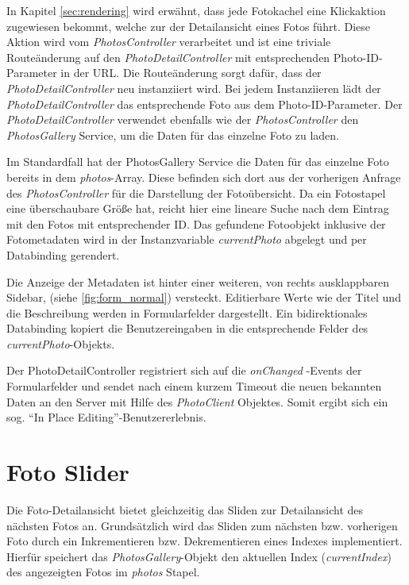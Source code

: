 In Kapitel \ref{sec:rendering} wird erwähnt, dass jede Fotokachel eine Klickaktion zugewiesen bekommt, welche zur der Detailansicht eines Fotos führt. Diese Aktion wird vom \emph{PhotosController} verarbeitet und ist eine triviale Routeänderung auf den \emph{PhotoDetailController} mit entsprechenden Photo-ID-Parameter in der URL. Die Routeänderung sorgt dafür, dass der \emph{PhotoDetailController} neu instanziiert wird. Bei jedem Instanziieren lädt der \emph{PhotoDetailController} das entsprechende Foto aus dem  Photo-ID-Parameter. Der \emph{PhotoDetailController} verwendet ebenfalls wie der \emph{PhotosController} den \emph{PhotosGallery} Service, um die Daten für das einzelne Foto zu laden.

Im Standardfall hat der PhotosGallery Service die Daten für das einzelne Foto bereits in dem \emph{photos}-Array. Diese befinden sich dort aus der vorherigen Anfrage des \emph{PhotosController} für die Darstellung der Fotoübersicht. Da ein Fotostapel eine überschaubare Größe hat, reicht hier eine lineare Suche nach dem Eintrag mit den Fotos mit entsprechender ID. Das gefundene Fotoobjekt inklusive der Fotometadaten wird in der Instanzvariable \emph{currentPhoto} abgelegt und per Databinding gerendert.

Die Anzeige der Metadaten ist hinter einer weiteren, von rechts ausklappbaren Sidebar, (siehe \ref{fig:form_normal}) versteckt. Editierbare Werte wie der Titel und die Beschreibung werden in Formularfelder dargestellt. Ein bidirektionales Databinding kopiert die Benutzereingaben in die entsprechende Felder des \emph{currentPhoto}-Objekts.

Der PhotoDetailController registriert sich auf die \emph{onChanged }-Events der Formularfelder und sendet nach einem kurzem Timeout die neuen bekannten Daten an den Server mit Hilfe des \emph{PhotoClient} Objektes. Somit ergibt sich ein sog. \enquote{In Place Editing}-Benutzererlebnis.

\section{Foto Slider}
\label{sec:photo_slider}

Die Foto-Detailansicht bietet gleichzeitig das Sliden zur Detailansicht des nächsten Fotos an. Grundsätzlich wird das Sliden zum nächsten bzw. vorherigen Foto durch ein Inkrementieren bzw. Dekrementieren eines Indexes implementiert. Hierfür speichert das \emph{PhotosGallery}-Objekt den aktuellen Index (\emph{currentIndex}) des angezeigten Fotos im \emph{photos} Stapel.

